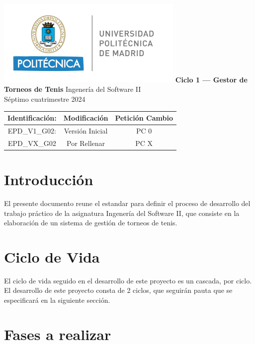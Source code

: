 \documentclass[titlepage,a4paper]{article}
\begin{document}
\begin{titlepage} %
	\hfill\includegraphics[width=9cm]{logoupm.png}
    \centering
    \vfill
    \Huge \textbf{Ciclo 1 — Gestor de Torneos de Tenis}
    \vskip2cm
    \Large Ingenería del Software II\\
    Séptimo cuatrimestre 2024 
    \vfill
    \begin{tabular}{ | c | c | c | } %
      \hline
      Identificación: & Modificación & Petición Cambio \\ \hline 
      EPD\_V1\_G02: & Versión Inicial & PC 0 \\ \hline
      EPD\_VX\_G02 & Por Rellenar & PC X \\ \hline
  	\end{tabular}
    \vfill
    \vfill
\end{titlepage}

\tableofcontents %
\newpage

\section{Introducción}\label{sec:intro} %
El presente documento reune el estandar para definir el proceso de desarrollo del trabajo práctico de la asignatura Ingenería del Software II, que consiste en la elaboración de un sistema de gestión de torneos de tenis. 

\section{Ciclo de Vida}\label{sec:tipo}

El ciclo de vida seguido en el desarrollo de este proyecto es un cascada, por ciclo. El desarrollo de este proyecto consta de 2 ciclos, que seguirán pauta que se especificará en la siguiente sección.

\section{Fases a realizar}\label{sec:modelo}
\end{document}
